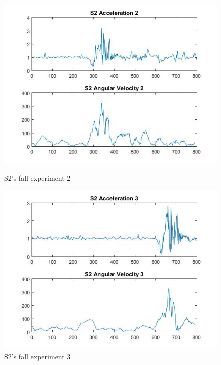 \documentclass[letterpaper,12pt,titlepage,oneside,final]{book}
\begin{document}
\begin{figure}[h!]
	\centering
	\hspace{-1cm}
	\begin{minipage}[b]{0.5\textwidth}
		\centering
		\includegraphics[scale=0.42]{S2_2}
		\caption{S2's fall experiment 2}
	\end{minipage}%
	\hfill
	\begin{minipage}[b]{0.5\textwidth}
		\centering
		\includegraphics[scale=0.42]{S2_3}
		\caption{S2's fall experiment 3}
	\end{minipage}	
\end{figure}
\end{document}
